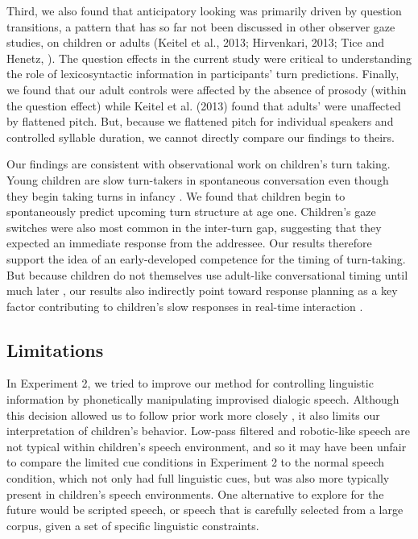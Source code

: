 \documentclass[authoryear, 12pt]{elsarticle}
\begin{document}
Third, we also found that anticipatory looking was primarily driven by question transitions, a pattern that has so far not been discussed in other observer gaze studies, on children or adults (Keitel et al., 2013; Hirvenkari, 2013; Tice and Henetz, \citeyear{TiceHenetz11}). The question effects in the current study were critical to understanding the role of lexicosyntactic information in participants' turn predictions. Finally, we found that our adult controls were affected by the absence of prosody (within the question effect) while Keitel et al. (2013) found that adults' were unaffected by flattened pitch. But, because we flattened pitch for individual speakers and controlled syllable duration, we cannot directly compare our findings to theirs.

Our findings are consistent with observational work on children's turn taking. Young children are slow turn-takers in spontaneous conversation \citep{casillasUndRev} even though they begin taking turns in infancy \citep{hilbrinkInPrep, jaffe2001}. We found that children begin to spontaneously predict upcoming turn structure at age one. Children's gaze switches were also most common in the inter-turn gap, suggesting that they expected an immediate response from the addressee. Our results therefore support the idea of an early-developed competence for the timing of turn-taking. But because children do not themselves use adult-like conversational timing until much later \citep[age six; ][]{ervin-tripp1979}, our results also indirectly point toward response planning as a key factor contributing to children's slow responses in real-time interaction \citep{casillasUndRev}.

\subsection{Limitations}

In Experiment 2, we tried to improve our method for controlling linguistic information by phonetically manipulating improvised dialogic speech. Although this decision allowed us to follow prior work more closely \citep{de-ruiter2006, keitel2013}, it also limits our interpretation of children's behavior. Low-pass filtered and robotic-like speech are not typical within children's speech environment, and so it may have been unfair to compare the limited cue conditions in Experiment 2 to the normal speech condition, which not only had full linguistic cues, but was also more typically present in children's speech environments. One alternative to explore for the future would be scripted speech, or speech that is carefully selected from a large corpus, given a set of specific linguistic constraints. 
\end{document}
